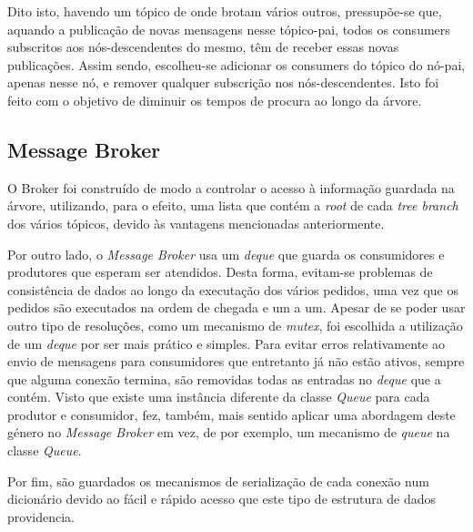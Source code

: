 \documentclass[10pt,portuguese]{article}
\begin{document}
\par Dito isto, havendo um tópico de onde brotam vários outros, pressupõe-se que, aquando a publicação de novas mensagens nesse tópico-pai, todos os consumers subscritos aos nós-descendentes do mesmo, têm de receber essas novas publicações. Assim sendo, escolheu-se adicionar os consumers do tópico do nó-pai, apenas nesse nó, e remover qualquer subscrição nos nós-descendentes. Isto foi feito com o objetivo de diminuir os tempos de procura ao longo da árvore.

\subsection{Message Broker}
\par O Broker foi construído de modo a controlar o acesso à informação guardada na árvore, utilizando, para o efeito, uma lista que contém a \textit{root} de cada \textit{tree branch} dos vários tópicos, devido às vantagens mencionadas anteriormente.

\par Por outro lado, o \textit{Message Broker} usa um \textit{deque} que guarda os consumidores e produtores que esperam ser atendidos. Desta forma, evitam-se problemas de consistência de dados ao longo da executação dos vários pedidos, uma vez que os pedidos são executados na ordem de chegada e um a um. Apesar de se poder usar outro tipo de resoluções, como um mecanismo de \textit{mutex}, foi escolhida a utilização de um \textit{deque} por ser mais prático e simples. Para evitar erros relativamente ao envio de mensagens para consumidores que entretanto já não estão ativos, sempre que alguma conexão termina, são removidas todas as entradas no \textit{deque} que a contém. Visto que existe uma instância diferente da classe \textit{Queue} para cada produtor e consumidor, fez, também, mais sentido aplicar uma abordagem deste género no \textit{Message Broker} em vez, de por exemplo, um mecanismo de \textit{queue} na classe \textit{Queue}.

\par Por fim, são guardados os mecanismos de serialização de cada conexão num dicionário devido ao fácil e rápido acesso que este tipo de estrutura de dados providencia. 

\clearpage
\end{document}
